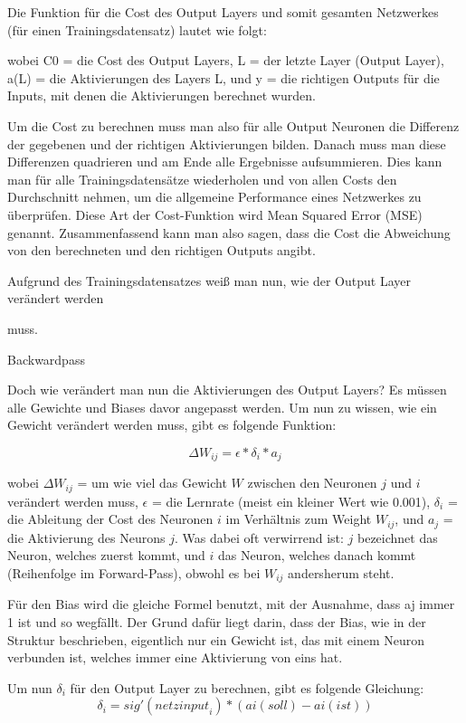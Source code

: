 \documentclass{scrartcl}
\begin{document}
	Die Funktion für die Cost des Output Layers und somit gesamten Netzwerkes (für einen Trainingsdatensatz) lautet wie folgt: 

	wobei C0 = die Cost des Output Layers, L = der letzte Layer (Output Layer), a(L) = die Aktivierungen des Layers L, und y = die richtigen Outputs für die Inputs, mit denen die Aktivierungen berechnet wurden.  

	Um die Cost zu berechnen muss man also für alle Output Neuronen die Differenz der gegebenen und der richtigen Aktivierungen bilden. Danach muss man diese Differenzen quadrieren und am Ende alle Ergebnisse aufsummieren. Dies kann man für alle Trainingsdatensätze wiederholen und von allen Costs den Durchschnitt nehmen, um die allgemeine Performance eines Netzwerkes zu überprüfen. Diese Art der Cost-Funktion wird Mean Squared Error (MSE) genannt. Zusammenfassend kann man also sagen, dass die Cost die Abweichung von den berechneten und den richtigen Outputs angibt. 

	Aufgrund des Trainingsdatensatzes weiß man nun, wie der Output Layer verändert werden 

	muss. 

	

	Backwardpass 

	Doch wie verändert man nun die Aktivierungen des Output Layers? Es müssen alle Gewichte und Biases davor angepasst werden. Um nun zu wissen, wie ein Gewicht verändert werden muss, gibt es folgende Funktion: 

	\[
		\Delta W_{ij} = \epsilon * \delta_i * a_j
	\]
	
	wobei $\Delta W_{ij}$ = um wie viel das Gewicht $W$ zwischen den Neuronen $j$ und $i$ verändert werden muss, $\epsilon$ = die Lernrate (meist ein kleiner Wert wie 0.001), $\delta_i$ = die Ableitung der Cost des Neuronen $i$ im Verhältnis zum Weight $W_{ij}$, und $a_j$ = die Aktivierung des Neurons $j$. Was dabei oft verwirrend ist: $j$ bezeichnet das Neuron, welches zuerst kommt, und $i$ das Neuron, welches danach kommt (Reihenfolge im Forward-Pass), obwohl es bei $W_{ij}$ andersherum steht. 

	Für den Bias wird die gleiche Formel benutzt, mit der Ausnahme, dass aj immer 1 ist und so wegfällt. Der Grund dafür liegt darin, dass der Bias, wie in der Struktur beschrieben, eigentlich nur ein Gewicht ist, das mit einem Neuron verbunden ist, welches immer eine Aktivierung von eins hat. 

	Um nun $\delta_i$ für den Output Layer zu berechnen, gibt es folgende Gleichung:
	\[
		\delta_i = sig'\left({netzinput}_i\right) * (ai(soll) - ai(ist)) 
	\]
\end{document}
